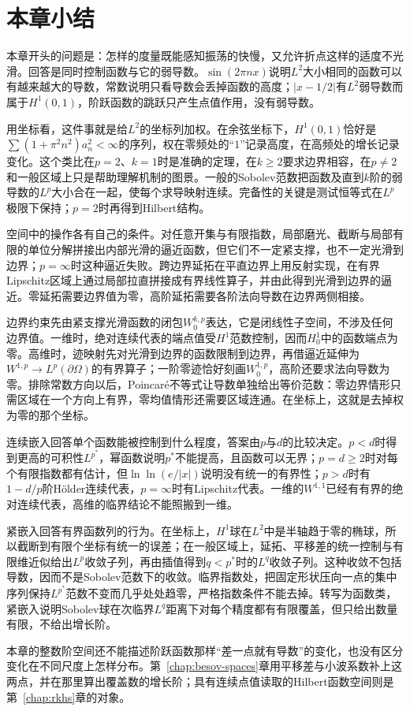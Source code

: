\section{本章小结}
\label{sec:sobolev-summary}

本章开头的问题是：怎样的度量既能感知振荡的快慢，又允许折点这样的适度不光滑。回答是同时控制函数与它的弱导数。$\sin(2\pi nx)$说明$L^2$大小相同的函数可以有越来越大的导数，常数说明只看导数会丢掉函数的高度；$|x-1/2|$有$L^2$弱导数而属于$H^1(0,1)$，阶跃函数的跳跃只产生点值作用，没有弱导数。

用坐标看，这件事就是给$L^2$的坐标列加权。在余弦坐标下，$H^1(0,1)$恰好是$\sum(1+\pi^2n^2)a_n^2<\infty$的序列，权在零频处的“$1$”记录高度，在高频处的增长记录变化。这个类比在$p=2$、$k=1$时是准确的定理，在$k\geq2$要求边界相容，在$p\neq2$和一般区域上只是帮助理解机制的图景。一般的Sobolev范数把函数及直到$k$阶的弱导数的$L^p$大小合在一起，使每个求导映射连续。完备性的关键是测试恒等式在$L^p$极限下保持；$p=2$时再得到Hilbert结构。

空间中的操作各有自己的条件。对任意开集与有限指数，局部磨光、截断与局部有限的单位分解拼接出内部光滑的逼近函数，但它们不一定紧支撑，也不一定光滑到边界；$p=\infty$时这种逼近失败。跨边界延拓在平直边界上用反射实现，在有界Lipschitz区域上通过局部拉直拼接成有界线性算子，并由此得到光滑到边界的逼近。零延拓需要边界值为零，高阶延拓需要各阶法向导数在边界两侧相接。

边界约束先由紧支撑光滑函数的闭包$W_0^{k,p}$表达，它是闭线性子空间，不涉及任何边界值。一维时，绝对连续代表的端点值受$H^1$范数控制，因而$H_0^1$中的函数端点为零。高维时，迹映射先对光滑到边界的函数限制到边界，再借逼近延伸为$W^{1,p}\to L^p(\partial\Omega)$的有界算子；一阶零迹恰好刻画$W_0^{1,p}$，高阶还要求法向导数为零。排除常数方向以后，Poincaré不等式让导数单独给出等价范数：零边界情形只需区域在一个方向上有界，零均值情形还需要区域连通。在坐标上，这就是去掉权为零的那个坐标。

连续嵌入回答单个函数能被控制到什么程度，答案由$p$与$d$的比较决定。$p<d$时得到更高的可积性$L^{p^*}$，幂函数说明$p^*$不能提高，且函数可以无界；$p=d\geq2$时对每个有限指数都有估计，但$\ln\ln(e/|x|)$说明没有统一的有界性；$p>d$时有$1-d/p$阶Hölder连续代表，$p=\infty$时有Lipschitz代表。一维的$W^{1,1}$已经有有界的绝对连续代表，高维的临界结论不能照搬到一维。

紧嵌入回答有界函数列的行为。在坐标上，$H^1$球在$L^2$中是半轴趋于零的椭球，所以截断到有限个坐标有统一的误差；在一般区域上，延拓、平移差的统一控制与有限维近似给出$L^p$收敛子列，再由插值得到$q<p^*$时的$L^q$收敛子列。这种收敛不包括导数，因而不是Sobolev范数下的收敛。临界指数处，把固定形状压向一点的集中序列保持$L^{p^*}$范数不变而几乎处处趋零，严格指数条件不能去掉。转写为函数类，紧嵌入说明Sobolev球在次临界$L^q$距离下对每个精度都有有限覆盖，但只给出数量有限，不给出增长阶。

本章的整数阶空间还不能描述阶跃函数那样“差一点就有导数”的变化，也没有区分变化在不同尺度上怎样分布。第~\ref{chap:besov-spaces}章用平移差与小波系数补上这两点，并在那里算出覆盖数的增长阶；具有连续点值读取的Hilbert函数空间则是第~\ref{chap:rkhs}章的对象。
